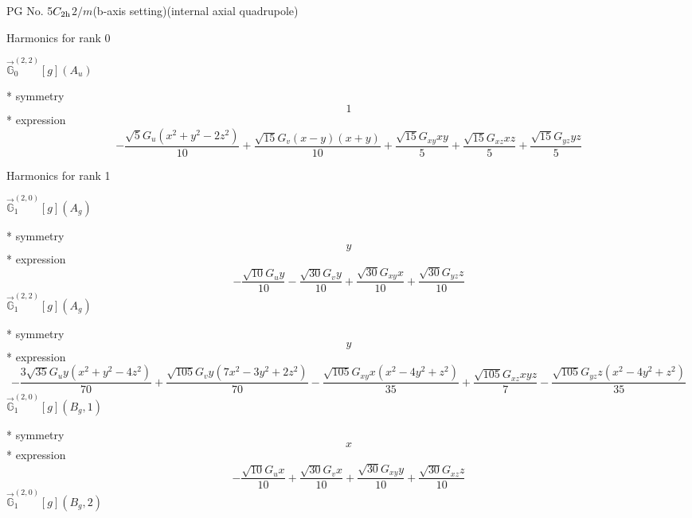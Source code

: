 \documentclass[fleqn,8pt]{jsarticle}
\begin{document}
\setcounter{MaxMatrixCols}{32}

\renewcommand{\tablename}{Table~}
\renewcommand{\figurename}{Figure~}
\begin{center}
\LARGE
PG No. 5\quad$C_{\rm 2h}$\quad$2/m$\quad(b-axis setting)\quad[ monoclinic ] (internal axial quadrupole)
\end{center}

\noindent * Harmonics for rank 0

\noindent\quad $\vec{\mathbb{G}}_{0}^{(2,2)}[g](A_{u})$

\noindent\quad ** symmetry
\begin{dmath*}
1
\end{dmath*}
\noindent\quad ** expression
\begin{dmath*}
- \frac{\sqrt{5} G_{u} \left(x^{2} + y^{2} - 2 z^{2}\right)}{10} + \frac{\sqrt{15} G_{v} \left(x - y\right) \left(x + y\right)}{10} + \frac{\sqrt{15} G_{xy} x y}{5} + \frac{\sqrt{15} G_{xz} x z}{5} + \frac{\sqrt{15} G_{yz} y z}{5}
\end{dmath*}

\noindent * Harmonics for rank 1

\noindent\quad $\vec{\mathbb{G}}_{1}^{(2,0)}[g](A_{g})$

\noindent\quad ** symmetry
\begin{dmath*}
y
\end{dmath*}
\noindent\quad ** expression
\begin{dmath*}
- \frac{\sqrt{10} G_{u} y}{10} - \frac{\sqrt{30} G_{v} y}{10} + \frac{\sqrt{30} G_{xy} x}{10} + \frac{\sqrt{30} G_{yz} z}{10}
\end{dmath*}
\noindent\quad $\vec{\mathbb{G}}_{1}^{(2,2)}[g](A_{g})$

\noindent\quad ** symmetry
\begin{dmath*}
y
\end{dmath*}
\noindent\quad ** expression
\begin{dmath*}
- \frac{3 \sqrt{35} G_{u} y \left(x^{2} + y^{2} - 4 z^{2}\right)}{70} + \frac{\sqrt{105} G_{v} y \left(7 x^{2} - 3 y^{2} + 2 z^{2}\right)}{70} - \frac{\sqrt{105} G_{xy} x \left(x^{2} - 4 y^{2} + z^{2}\right)}{35} + \frac{\sqrt{105} G_{xz} x y z}{7} - \frac{\sqrt{105} G_{yz} z \left(x^{2} - 4 y^{2} + z^{2}\right)}{35}
\end{dmath*}
\noindent\quad $\vec{\mathbb{G}}_{1}^{(2,0)}[g](B_{g},1)$

\noindent\quad ** symmetry
\begin{dmath*}
x
\end{dmath*}
\noindent\quad ** expression
\begin{dmath*}
- \frac{\sqrt{10} G_{u} x}{10} + \frac{\sqrt{30} G_{v} x}{10} + \frac{\sqrt{30} G_{xy} y}{10} + \frac{\sqrt{30} G_{xz} z}{10}
\end{dmath*}
\noindent\quad $\vec{\mathbb{G}}_{1}^{(2,0)}[g](B_{g},2)$
\end{document}
